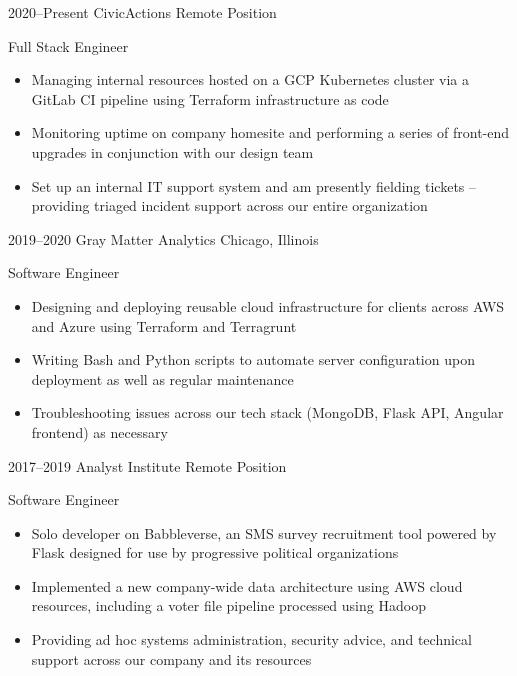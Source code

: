 \documentclass[letterpaper]{friggeri-cv} %
\begin{document}
\begin{entrylist}


\entry
{2020--Present}
{CivicActions}
{Remote Position}
{{Full Stack Engineer}
\begin{itemize}
\item Managing internal resources hosted on a GCP Kubernetes cluster via a GitLab CI pipeline using Terraform infrastructure as code
\item Monitoring uptime on company homesite and performing a series of front-end upgrades in conjunction with our design team
\item Set up an internal IT support system and am presently fielding tickets -- providing triaged incident support across our entire organization
\end{itemize}}


\entry
{2019--2020}
{Gray Matter Analytics}
{Chicago, Illinois}
{{Software Engineer}
\begin{itemize}
\item Designing and deploying reusable cloud infrastructure for clients across AWS and Azure using Terraform and Terragrunt
\item Writing Bash and Python scripts to automate server configuration upon deployment as well as regular maintenance
\item Troubleshooting issues across our tech stack (MongoDB, Flask API, Angular frontend) as necessary
\end{itemize}}


\entry
{2017--2019}
{Analyst Institute}
{Remote Position}
{{Software Engineer}
\begin{itemize}
\item Solo developer on Babbleverse, an SMS survey recruitment tool powered by Flask designed for use by progressive political organizations
\item Implemented a new company-wide data architecture using AWS cloud resources, including a voter file pipeline processed using Hadoop
\item Providing ad hoc systems administration, security advice, and technical support across our company and its resources
\end{itemize}}



\end{entrylist}
\end{document}
